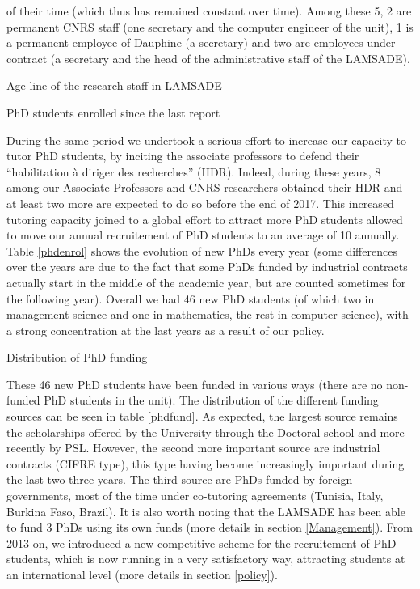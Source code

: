 of their time (which thus has remained constant over time). Among these 5, 2 are permanent CNRS staff (one secretary and the computer engineer of the unit), 1 is a permanent employee of Dauphine (a secretary) and two are employees under contract (a secretary and the head of the administrative staff of the LAMSADE).

\begin{table}
  \centering
  \caption{Age line of the research staff in LAMSADE}\label{ageline}
\end{table}

\begin{table}
  \centering
  \caption{PhD students enrolled since the last report}\label{phdenrol}
\end{table}

During the same period we undertook a serious effort to increase our capacity to tutor PhD students, by inciting the 
associate professors to defend their ``habilitation à diriger des recherches'' (HDR). Indeed, during these years, 8 among our Associate Professors and CNRS researchers obtained their HDR and at least two more are expected to do so before the end of 2017. This increased tutoring capacity joined to a global effort to attract more PhD students allowed to move our annual recruitement of PhD students to an average of 10 annually. Table \ref{phdenrol} shows the evolution of new PhDs every year (some differences over the years are due to the fact that some PhDs funded by industrial contracts actually start in the middle of the academic year, but are counted sometimes for the following year). Overall we had 46 new PhD students (of which two in management science and one in mathematics, the rest in computer science), with a strong concentration at the last years as a result of our policy.

\begin{table}
  \centering
  \caption{Distribution of PhD funding}\label{phdfund}
\end{table}

These 46 new PhD students have been funded in various ways (there are no non-funded PhD students in the unit). The distribution of the different funding sources can be seen in table \ref{phdfund}. As expected, the largest source remains the scholarships offered by the University through the Doctoral school and more recently by PSL. However, the second more important source are industrial contracts (CIFRE type), this type having become increasingly important during the last two-three years. The third source are PhDs funded by foreign governments, most of the time under co-tutoring agreements (Tunisia, Italy, Burkina Faso, Brazil). It is also worth noting that the LAMSADE has been able to fund 3 PhDs using its own funds (more details in section \ref{Management}). From 2013 on, we introduced a new competitive scheme for the recruitement of PhD students, which is now running in a very satisfactory way, attracting students at an international level (more details in section \ref{policy}).

